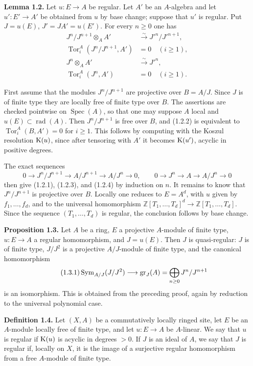 \documentclass[11pt]{article}
\newcommand{\Tor}{\operatorname{Tor}}
\newcommand{\Spec}{\operatorname{Spec}}
\providecommand{\rad}{\operatorname{rad}}
\providecommand{\Tor}{\operatorname{Tor}}
\begin{document}
\textbf{Lemma 1.2.} Let \(u:E\to A\) be regular. Let \(A'\) be an \(A\)-algebra and let \(u':E'\to A'\) be obtained from \(u\) by base change; suppose that \(u'\) is regular. Put \(J=u(E)\), \(J'=JA'=u(E')\). For every \(n\ge0\) one has
\begin{align}
 J^n/J^{n+1}\otimes_AA'&\xrightarrow{\sim}J'^n/J'^{n+1}, \tag{1.2.1}\\
 \Tor_i^A(J^n/J^{n+1},A')&=0\quad(i\ge1), \tag{1.2.2}\\
 J^n\otimes_AA'&\xrightarrow{\sim}J'^n, \tag{1.2.3}\\
 \Tor_i^A(J^n,A')&=0\quad(i\ge1). \tag{1.2.4}
\end{align}

First assume that the modules \(J^n/J^{n+1}\) are projective over \(B=A/J\). Since \(J\) is of finite type they are locally free of finite type over \(B\). The assertions are checked pointwise on \(\Spec(A)\), so that one may suppose \(A\) local and \(u(E)\subset\rad(A)\). Then \(J^n/J^{n+1}\) is free over \(B\), and (1.2.2) is equivalent to \(\Tor_i^A(B,A')=0\) for \(i\ge1\). This follows by computing with the Koszul resolution \(\mathrm K(u)\), since after tensoring with \(A'\) it becomes \(\mathrm K(u')\), acyclic in positive degrees.

The exact sequences
\[
0\to J^n/J^{n+1}\to A/J^{n+1}\to A/J^n\to0,
\qquad
0\to J^n\to A\to A/J^n\to0
\]
then give (1.2.1), (1.2.3), and (1.2.4) by induction on \(n\). It remains to know that \(J^n/J^{n+1}\) is projective over \(B\). Locally one reduces to \(E=A^d\), with \(u\) given by \(f_1,\ldots,f_d\), and to the universal homomorphism \(\mathbb Z[T_1,\ldots,T_d]^d\to \mathbb Z[T_1,\ldots,T_d]\). Since the sequence \((T_1,\ldots,T_d)\) is regular, the conclusion follows by base change.

\textbf{Proposition 1.3.} Let \(A\) be a ring, \(E\) a projective \(A\)-module of finite type, \(u:E\to A\) a regular homomorphism, and \(J=u(E)\). Then \(J\) is quasi-regular: \(J\) is of finite type, \(J/J^2\) is a projective \(A/J\)-module of finite type, and the canonical homomorphism
\begin{equation}\tag{1.3.1}
 \operatorname{Sym}_{A/J}(J/J^2)\longrightarrow \operatorname{gr}_J(A)=\bigoplus_{n\ge0}J^n/J^{n+1}
\end{equation}
is an isomorphism. This is obtained from the preceding proof, again by reduction to the universal polynomial case.

\textbf{Definition 1.4.} Let \((X,A)\) be a commutatively locally ringed site, let \(E\) be an \(A\)-module locally free of finite type, and let \(u:E\to A\) be \(A\)-linear. We say that \(u\) is regular if \(\mathrm K(u)\) is acyclic in degrees \(>0\). If \(J\) is an ideal of \(A\), we say that \(J\) is regular if, locally on \(X\), it is the image of a surjective regular homomorphism from a free \(A\)-module of finite type.
\end{document}
